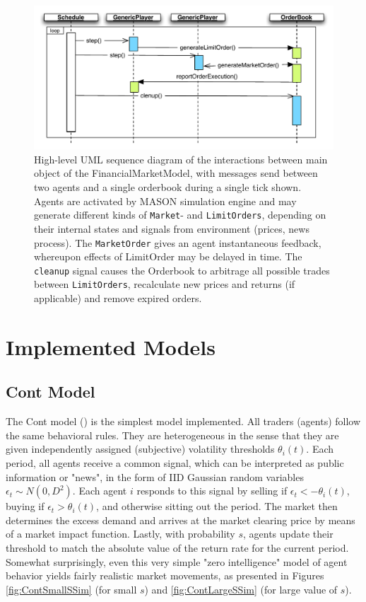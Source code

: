 \documentclass[runningheads]{llncs}
\begin{document}
\begin{figure}[htb]
\centering
\includegraphics[width=1.0\textwidth]{../graphics/masterSequenceDiagram.pdf}
\caption{High-level UML sequence diagram of the interactions between main object of the FinancialMarketModel, with messages send between two agents and a single orderbook during a single tick shown. Agents are activated by MASON simulation engine and may generate different kinds of \texttt{Market}- and \texttt{LimitOrders}, depending on their internal states and signals from environment (prices, news process). The \texttt{MarketOrder} gives an agent instantaneous feedback, whereupon effects of LimitOrder may be delayed in time. The \texttt{cleanup} signal causes the Orderbook to arbitrage all possible trades between \texttt{LimitOrders}, recalculate new prices and returns (if applicable) and remove expired orders.}
\label{fig:general_sequence}
\end{figure}


\section{Implemented Models}

\subsection{Cont Model}

The Cont model (\cite{cont2006}) is the simplest model implemented. All traders (agents) follow the same behavioral rules. They are heterogeneous in the sense that they are given independently assigned (subjective) volatility thresholds $\theta_i(t)$. Each period, all agents receive a common signal, which can be interpreted as public information or "news", in the form of IID Gaussian random variables $\epsilon_t \sim N(0,D^2)$. Each agent $i$ responds to this signal by selling if $\epsilon_t < -\theta_i(t)$, buying if $\epsilon_t > \theta_i(t)$, and otherwise sitting out the period. The market then determines the excess demand and arrives at the market clearing price by means of a market impact function. Lastly, with probability $s$, agents update their threshold to match the absolute value of the return rate for the current period. Somewhat surprisingly, even this very simple "zero intelligence" model of agent behavior yields fairly realistic market movements, as presented in Figures \ref{fig:ContSmallSSim} (for small $s$) and \ref{fig:ContLargeSSim} (for large value of $s$). 
\end{document}
